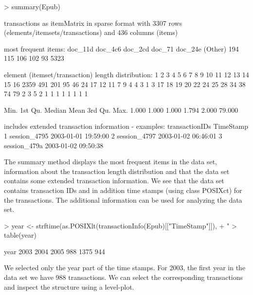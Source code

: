 \documentclass[10pt,a4paper]{article}
\newcommand{\class}[1]{\textsf{#1}}
\begin{document}
\begin{Schunk}
\begin{Sinput}
> summary(Epub)
\end{Sinput}
\begin{Soutput}
transactions as itemMatrix in sparse format with
 3307 rows (elements/itemsets/transactions) and
 436 columns (items)

most frequent items:
doc_11d doc_4c6 doc_2cd  doc_71 doc_24e (Other) 
    194     115     106     102      93    5323 

element (itemset/transaction) length distribution:
   1    2    3    4    5    6    7    8    9   10   11   12   13   14   15   16 
2359  491  201   95   46   24   17   12   11    7    9    4    4    3    1    3 
  17   18   19   20   22   24   25   28   34   38   74   79 
   2    3    5    2    1    1    1    1    1    1    1    1 

   Min. 1st Qu.  Median    Mean 3rd Qu.    Max. 
  1.000   1.000   1.000   1.794   2.000  79.000 

includes extended transaction information - examples:
  transactionIDs           TimeStamp
1   session_4795 2003-01-01 19:59:00
2   session_4797 2003-01-02 06:46:01
3   session_479a 2003-01-02 09:50:38
\end{Soutput}
\end{Schunk}

The summary method displays the most frequent items in the data set,
information about the transaction length distribution and that the data
set contains some extended transaction information.  We see that the
data set contains transaction IDs and in addition time stamps (using class
\class{POSIXct}) for the
transactions.  The additional information can be used for analyzing the
data set.

\begin{Schunk}
\begin{Sinput}
> year <- strftime(as.POSIXlt(transactionInfo(Epub)[["TimeStamp"]]), 
+     "%
> table(year)
\end{Sinput}
\begin{Soutput}
year
2003 2004 2005 
 988 1375  944 

\end{Soutput}
\end{Schunk}

We selected only the year part of the time stamps. For 2003, the first year
in the data set we have 988 transactions.
We can select the corresponding transactions and inspect the structure
using a level-plot. 
\end{document}
